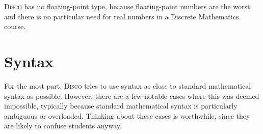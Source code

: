 \documentclass[submission,copyright,creativecommons]{eptcs}
\newcommand{\disco}{\textsc{Disco}\xspace}
\begin{document}
\disco has no floating-point type, because floating-point numbers are
the worst \cite{goldberg1991every} and there is no particular need for real numbers
in a Discrete Mathematics course.




\section{Syntax}

For the most part, \disco tries to use syntax as close to standard
mathematical syntax as possible.  However, there are a few notable
cases where this was deemed impossible, typically because standard
mathematical syntax is particularly ambiguous or overloaded.  Thinking
about these cases is worthwhile, since they are likely to confuse
students anyway.
\end{document}

